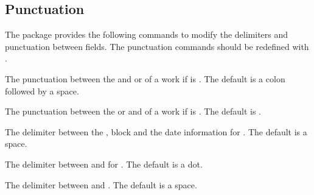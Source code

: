 \documentclass[DIV=9]{scrartcl}
\makeatletter
\def\textvisiblespace{%
  \raisebox{-2.2pt}{%
    \mbox{\kern.04em\vrule \@height.5ex \@width.12ex}%
    \vbox{\hrule \@width.2em \@height.12ex}%
    \hbox{\vrule \@height.5ex \@width.12ex}%
    \kern.04em}}
\newcommand*{\highlight}[2][1]{\textcolor{highlight#1}{#2}}
\newcommand*{\highlightbf}[2][1]{\textcolor{highlight#1}{\textbf{#2}}}
\makeatother
\begin{document}

\subsection{Punctuation}\label{sec:opt:punct}
The package provides the following commands to modify the delimiters and
punctuation between fields.
The punctuation commands should be redefined with .
\begin{ltxsyntax}
The punctuation between the  and  or
 of a work if  is .
The default is a colon followed by a space.
\begin{bibexample}
\togglefalse{bbx:isbn}
\renewcommand*{\maintitletitledelim}{\highlight{\textbf{\addcolon}%
  \textvisiblespace}}
\end{bibexample}

The punctuation between the  or  and
 of a work if  is .
The default is .
\begin{bibexample}
\togglefalse{bbx:isbn}
\toggletrue{bbx:maintitleaftertitle}
\renewcommand*{\titlemaintitledelim}{\highlight{\textbf{\addperiod}%
  \textvisiblespace}\bibsentence}
\end{bibexample}

The delimiter between the ,  block and the
date information for .
The default is a space.
\begin{bibexample}
\togglefalse{bbx:doi}
\renewcommand*{\volnumdatedelim}{\highlight{\textvisiblespace}}
\makeatletter\bbx@opt@mergedate@false\makeatother
{}
\end{bibexample}


The delimiter between  and  for
.
The default is a dot.
\begin{bibexample}
\togglefalse{bbx:doi}
\renewcommand*{\volnumdelim}{\highlightbf{\adddot}}
\end{bibexample}

The delimiter between  and .
The default is a space.
\begin{bibexample}
\renewcommand*{\sernumdelim}{\highlight{\textvisiblespace}}
\end{bibexample}


\end{ltxsyntax}
\end{document}
